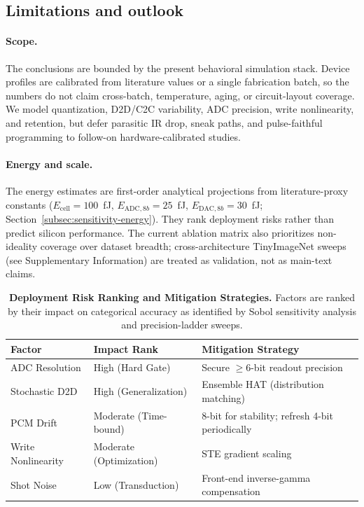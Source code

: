 \subsection{Limitations and outlook}
\label{subsec:limitations}

\paragraph{Scope.} The conclusions are bounded by the present behavioral simulation stack. Device profiles are calibrated from literature values or a single fabrication batch, so the numbers do not claim cross-batch, temperature, aging, or circuit-layout coverage. We model quantization, D2D/C2C variability, ADC precision, write nonlinearity, and retention, but defer parasitic IR drop, sneak paths, and pulse-faithful programming to follow-on hardware-calibrated studies.

\paragraph{Energy and scale.} The energy estimates are first-order analytical projections from literature-proxy constants ($E_{\text{cell}}=100$~fJ, $E_{\text{ADC},8b}=25$~fJ, $E_{\text{DAC},8b}=30$~fJ; Section~\ref{subsec:sensitivity-energy}). They rank deployment risks rather than predict silicon performance. The current ablation matrix also prioritizes non-ideality coverage over dataset breadth; cross-architecture TinyImageNet sweeps (see Supplementary Information) are treated as validation, not as main-text claims.

\begin{table}[htbp]
\centering
\caption{\textbf{Deployment Risk Ranking and Mitigation Strategies.} Factors are ranked by their impact on categorical accuracy as identified by Sobol sensitivity analysis and precision-ladder sweeps.}
\label{tab:deployment_risks}
\begin{tabular}{lll}
\toprule
\textbf{Factor} & \textbf{Impact Rank} & \textbf{Mitigation Strategy} \\
\midrule
ADC Resolution & High (Hard Gate) & Secure $\geq$6-bit readout precision \\
Stochastic D2D & High (Generalization) & Ensemble HAT (distribution matching) \\
PCM Drift & Moderate (Time-bound) & 8-bit for stability; refresh 4-bit periodically \\
Write Nonlinearity & Moderate (Optimization) & STE gradient scaling \\
Shot Noise & Low (Transduction) & Front-end inverse-gamma compensation \\
\bottomrule
\end{tabular}
\end{table}

